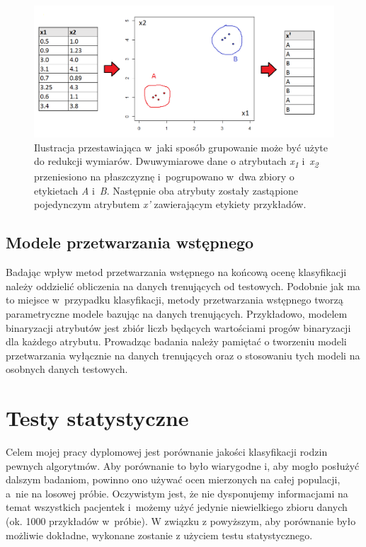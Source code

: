 \documentclass[../thesis.tex]{subfiles}
\begin{document}
\begin{figure}[h]
\centering
\includegraphics[height=.25\textheight]{grouping.png}
\caption{Ilustracja przestawiająca w~jaki sposób grupowanie może być użyte do redukcji wymiarów. Dwuwymiarowe dane o atrybutach \emph{x\textsubscript{1}} i~\emph{x\textsubscript{2}} przeniesiono na płaszczyznę i~pogrupowano w~dwa zbiory o etykietach \emph{A} i~\emph{B}. Następnie oba atrybuty zostały zastąpione pojedynczym atrybutem \emph{x'} zawierającym etykiety przykładów. }
\label{classification:grouping}
\end{figure}

\subsection{Modele przetwarzania wstępnego}

Badając wpływ metod przetwarzania wstępnego na końcową ocenę klasyfikacji należy oddzielić obliczenia na danych trenujących od testowych. Podobnie jak ma to miejsce w~przypadku klasyfikacji, metody przetwarzania wstępnego tworzą parametryczne modele bazując na danych trenujących. Przykładowo, modelem binaryzacji atrybutów jest zbiór liczb będących wartościami progów binaryzacji dla każdego atrybutu. Prowadząc badania należy pamiętać o tworzeniu modeli przetwarzania wyłącznie na danych trenujących oraz o stosowaniu tych modeli na osobnych danych testowych.

\section{Testy statystyczne}

Celem mojej pracy dyplomowej jest porównanie jakości klasyfikacji rodzin pewnych algorytmów. Aby porównanie to było wiarygodne i, aby mogło posłużyć dalszym badaniom, powinno ono używać ocen mierzonych na całej populacji, a~nie na losowej próbie. Oczywistym jest, że nie dysponujemy informacjami na temat wszystkich pacjentek i~możemy użyć jedynie niewielkiego zbioru danych (ok. 1000 przykładów w~próbie). W związku z powyższym, aby porównanie było możliwie dokładne, wykonane zostanie z użyciem testu statystycznego.
\end{document}

